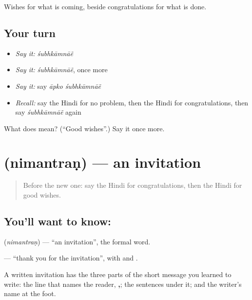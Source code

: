 \begin{grammarlens}[title={What you've built}]
Wishes for what is coming, beside congratulations for what is done.
\end{grammarlens}

\subsection*{Your turn}
\begin{itemize}
\raggedright
  \item \emph{Say it:} \emph{śubhkāmnāẽ}
  \item \emph{Say it:} \emph{śubhkāmnāẽ}, once more
  \item \emph{Say it:} say \emph{āpko śubhkāmnāẽ}
  \item \emph{Recall:} say the Hindi for no problem, then the Hindi for congratulations, then say \emph{śubhkāmnāẽ} again
\end{itemize}

\begin{tcolorbox}[breakable,colback=teal!4,colframe=teal!35!black,title={Before you move on}]
What does  mean? (\textquotedblleft{}Good wishes\textquotedblright{}.) Say it once more.
\end{tcolorbox}
\section[\texorpdfstring{\hi{निमंत्रण} (nimantraṇ)}{निमंत्रण (nimantraṇ)}]{ (nimantraṇ) — an invitation}

\label{lesson:HI-C114-nimantran}



\begin{quote}
Before the new one: say the Hindi for congratulations, then the Hindi for good wishes.
\end{quote}

\subsection*{You'll want to know: }
\textbf{} (\emph{nimantraṇ}) — \textquotedblleft{}an invitation\textquotedblright{}, the formal word.

\textbf{   } — \textquotedblleft{}thank you for the invitation\textquotedblright{}, with \textbf{ } and \textbf{}.

A written invitation has the three parts of the short message you learned to write: the line that names the reader, \textbf{ ,}; the sentences under it; and the writer's name at the foot.

